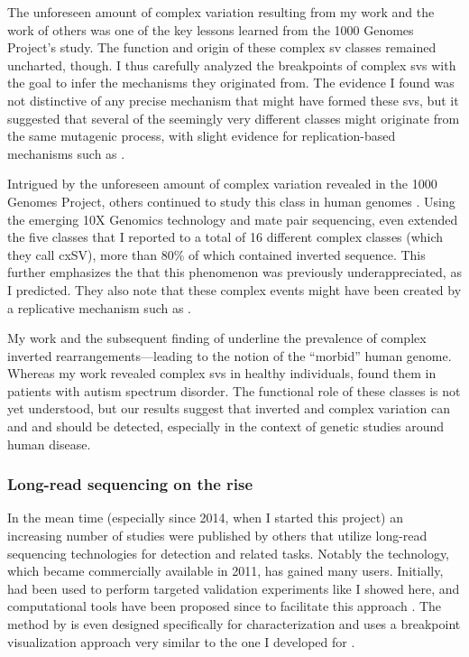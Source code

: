 The unforeseen amount of complex variation resulting from my work and the work
of others was one of the key lessons learned from the 1000 Genomes Project's \sv
study. The function and origin of these complex sv classes remained uncharted,
though. I thus carefully analyzed the breakpoints of complex \acp{sv} with the
goal to infer the mechanisms they originated from. The evidence I found was not
distinctive of any precise mechanism that might have formed these \acp{sv}, but
it suggested that several of the seemingly very different classes might
originate from the same mutagenic process, with slight evidence for replication-based
mechanisms such as \mmbir.

Intrigued by the unforeseen amount of complex variation revealed in the 1000 Genomes
Project, others continued to study this \sv class in human genomes \citep{Chaisson2014,Collins2017}.
Using the emerging 10X Genomics technology and mate pair sequencing, \citet{Collins2017} even extended
the five classes that I reported to a total of 16 different complex \sv classes
(which they call cxSV), more than 80\% of which contained inverted sequence.
This further emphasizes the that this phenomenon was previously underappreciated,
as I predicted. They also note that these complex events might have been created
by a replicative mechanism such as \mmbir.

My work and the subsequent finding of \citet{Collins2017} underline the
prevalence of complex inverted rearrangements---leading to the notion of the ``morbid''
human genome. Whereas my work revealed complex \acp{sv} in healthy individuals,
 found them in patients with autism spectrum disorder. The
functional role of these \sv classes is not yet understood, but our results
suggest that inverted and complex variation can and and should be detected,
especially in the context of genetic studies around human disease.




\subsubsection{Long-read sequencing on the rise}

In the mean time (especially since 2014, when I started this project) an
increasing number of studies were published by others that utilize long-read
sequencing technologies for \sv detection and related tasks.
Notably the \pacbio technology, which became commercially
available in 2011, has gained many users. Initially, \pacbio had been used to
perform targeted validation experiments like I showed here, and computational tools
have been proposed since to facilitate this approach \citep{Wang2015,Rudewicz2016}.
The method by \citet{Wang2015} is even designed specifically for \sv
characterization and uses a breakpoint visualization approach very similar to
the one I developed for \maze.

